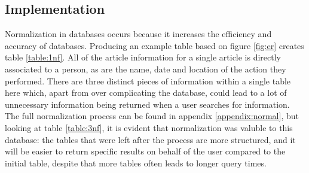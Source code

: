 \documentclass[11pt,a4paper]{book}
\begin{document}
\subsection{Implementation}
Normalization in databases occurs because it increases the efficiency and accuracy of databases. Producing an example table based on figure \ref{fig:er} creates table \ref{table:1nf}. All of the article information for a single article is directly associated to a person, as are the name, date and location of the action they performed. There are three distinct pieces of information within a single table here which, apart from over complicating the database, could lead to a lot of unnecessary information being returned when a user searches for information. The full normalization process can be found in appendix \ref{appendix:normal}, but looking at table \ref{table:3nf}, it is evident that normalization was valuble to this database: the tables that were left after the process are more structured, and it will be easier to return specific results on behalf of the user compared to the initial table, despite that more tables often leads to longer query times.

\begin{table}[H]
\caption{Before Normalization}
\label{table:1nf}
\noindent{}%
\end{table}
\end{document}
